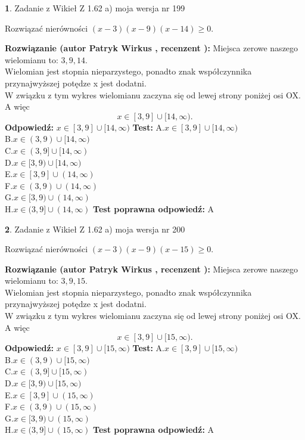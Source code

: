 \documentclass[12pt, a4paper]{article}
\theoremstyle{definition} %
\newtheorem{zad}{}
\newcommand{\zadStart}[1]{\begin{zad}#1\newline}
\newcommand{\zadStop}{\end{zad}}
\newcommand{\rozwStart}[2]{\noindent \textbf{Rozwiązanie (autor #1 , recenzent #2): }\newline}
\newcommand{\rozwStop}{\newline}
\newcommand{\odpStart}{\noindent \textbf{Odpowiedź:}\newline}
\newcommand{\odpStop}{\newline}
\newcommand{\testStart}{\noindent \textbf{Test:}\newline}
\newcommand{\testStop}{\newline}
\newcommand{\kluczStart}{\noindent \textbf{Test poprawna odpowiedź:}\newline}
\newcommand{\kluczStop}{\newline}
\begin{document}
\zadStart{Zadanie z Wikieł Z 1.62 a) moja wersja nr 199}

Rozwiązać nierówności $(x-3)(x-9)(x-14)\ge0$.
\zadStop
\rozwStart{Patryk Wirkus}{}
Miejsca zerowe naszego wielomianu to: $3, 9, 14$.\\
Wielomian jest stopnia nieparzystego, ponadto znak współczynnika przy\linebreak najwyższej potędze x jest dodatni.\\ W związku z tym wykres wielomianu zaczyna się od lewej strony poniżej osi OX. A więc $$x \in [3,9] \cup [14,\infty).$$
\rozwStop
\odpStart
$x \in [3,9] \cup [14,\infty)$
\odpStop
\testStart
A.$x \in [3,9] \cup [14,\infty)$\\
B.$x \in (3,9) \cup [14,\infty)$\\
C.$x \in (3,9] \cup [14,\infty)$\\
D.$x \in [3,9) \cup [14,\infty)$\\
E.$x \in [3,9] \cup (14,\infty)$\\
F.$x \in (3,9) \cup (14,\infty)$\\
G.$x \in [3,9) \cup (14,\infty)$\\
H.$x \in (3,9] \cup (14,\infty)$
\testStop
\kluczStart
A
\kluczStop



\zadStart{Zadanie z Wikieł Z 1.62 a) moja wersja nr 200}

Rozwiązać nierówności $(x-3)(x-9)(x-15)\ge0$.
\zadStop
\rozwStart{Patryk Wirkus}{}
Miejsca zerowe naszego wielomianu to: $3, 9, 15$.\\
Wielomian jest stopnia nieparzystego, ponadto znak współczynnika przy\linebreak najwyższej potędze x jest dodatni.\\ W związku z tym wykres wielomianu zaczyna się od lewej strony poniżej osi OX. A więc $$x \in [3,9] \cup [15,\infty).$$
\rozwStop
\odpStart
$x \in [3,9] \cup [15,\infty)$
\odpStop
\testStart
A.$x \in [3,9] \cup [15,\infty)$\\
B.$x \in (3,9) \cup [15,\infty)$\\
C.$x \in (3,9] \cup [15,\infty)$\\
D.$x \in [3,9) \cup [15,\infty)$\\
E.$x \in [3,9] \cup (15,\infty)$\\
F.$x \in (3,9) \cup (15,\infty)$\\
G.$x \in [3,9) \cup (15,\infty)$\\
H.$x \in (3,9] \cup (15,\infty)$
\testStop
\kluczStart
A
\kluczStop
\end{document}
